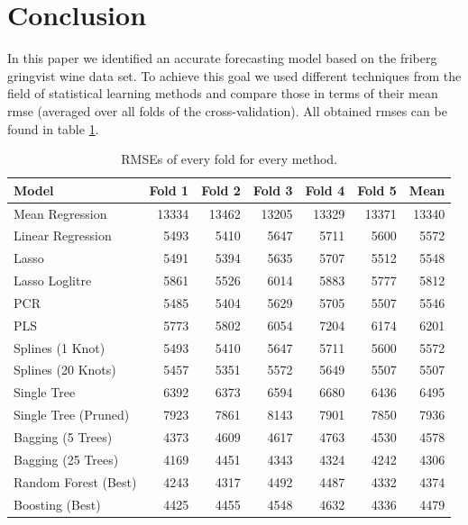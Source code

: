 \documentclass[11pt,]{article}
\begin{document}
\hypertarget{conclusion}{%
\section{Conclusion}\label{conclusion}}

In this paper we identified an accurate forecasting model based on the
friberg gringvist wine data set. To achieve this goal we used different
techniques from the field of statistical learning methods and compare
those in terms of their mean \ac{rmse} (averaged over all folds of the
cross-validation). All obtained \ac{rmse}s can be found in table
\ref{tab:RMSESum}.

\begin{table}[t]

\caption{\label{tab:RMSE}\label{tab:RMSESum}RMSEs of every fold for every method.}
\centering
\begin{tabular}{lrrrrrr}
\toprule
Model & Fold 1 & Fold 2 & Fold 3 & Fold 4 & Fold 5 & Mean\\
\midrule
Mean Regression & 13334 & 13462 & 13205 & 13329 & 13371 & 13340\\
Linear Regression & 5493 & 5410 & 5647 & 5711 & 5600 & 5572\\
Lasso & 5491 & 5394 & 5635 & 5707 & 5512 & 5548\\
Lasso Loglitre & 5861 & 5526 & 6014 & 5883 & 5777 & 5812\\
PCR & 5485 & 5404 & 5629 & 5705 & 5507 & 5546\\
\addlinespace
PLS & 5773 & 5802 & 6054 & 7204 & 6174 & 6201\\
Splines (1 Knot) & 5493 & 5410 & 5647 & 5711 & 5600 & 5572\\
Splines (20 Knots) & 5457 & 5351 & 5572 & 5649 & 5507 & 5507\\
Single Tree & 6392 & 6373 & 6594 & 6680 & 6436 & 6495\\
Single Tree (Pruned) & 7923 & 7861 & 8143 & 7901 & 7850 & 7936\\
\addlinespace
Bagging (5 Trees) & 4373 & 4609 & 4617 & 4763 & 4530 & 4578\\
Bagging (25 Trees) & 4169 & 4451 & 4343 & 4324 & 4242 & 4306\\
Random Forest (Best) & 4243 & 4317 & 4492 & 4487 & 4332 & 4374\\
Boosting (Best) & 4425 & 4455 & 4548 & 4632 & 4336 & 4479\\
\bottomrule
\end{tabular}
\end{table}
\end{document}
